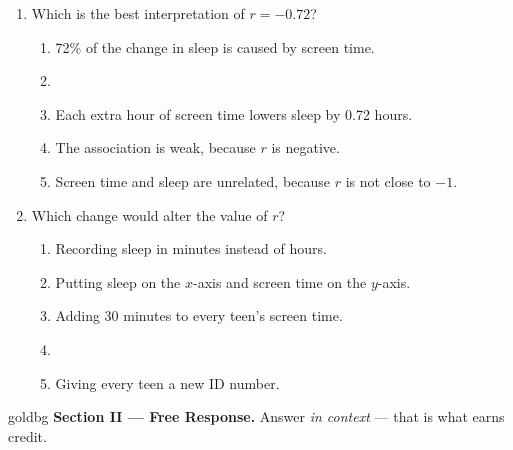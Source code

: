 \documentclass[12pt]{article}
\begin{document}
\begin{enumerate}[leftmargin=1.9em, itemsep=0.06in, topsep=4pt]

  \item Which is the best interpretation of $r = -0.72$?
        \begin{enumerate}[label=\textbf{(\Alph*)}, leftmargin=2.2em, itemsep=0pt, topsep=2pt]
          \item 72\% of the change in sleep is caused by screen time.
          \item {}
          \item Each extra hour of screen time lowers sleep by 0.72 hours.
          \item The association is weak, because $r$ is negative.
          \item Screen time and sleep are unrelated, because $r$ is not close to $-1$.
                \hfill{}\rule[-0.2in]{0pt}{0.48in}
        \end{enumerate}

  \item Which change would alter the value of $r$?
        \begin{enumerate}[label=\textbf{(\Alph*)}, leftmargin=2.2em, itemsep=0pt, topsep=2pt]
          \item Recording sleep in minutes instead of hours.
          \item Putting sleep on the $x$-axis and screen time on the $y$-axis.
          \item Adding 30 minutes to every teen's screen time.
          \item {}
          \item Giving every teen a new ID number.
                \hfill{}\rule[-0.2in]{0pt}{0.48in}
        \end{enumerate}

\end{enumerate}

\vspace{0.04in}

\boxguard[22]
\begin{headlinebox}{goldbg}
\small
\textbf{Section II --- Free Response.} Answer \emph{in context} --- that is what earns
credit.
\end{headlinebox}
\end{document}
